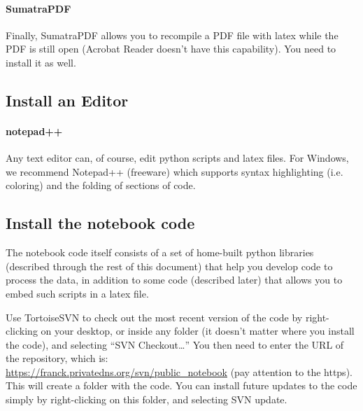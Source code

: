 \paragraph{SumatraPDF}
Finally, SumatraPDF allows you to recompile a PDF
    file with latex while the PDF is still open
    (Acrobat Reader doesn't have this capability).
You need to install it as well.
\subsection{Install an Editor}
\paragraph{notepad++}
Any text editor can, of course, edit
    python scripts and latex files.
For Windows,
    we recommend Notepad++ (freeware)
    which supports syntax highlighting (i.e. coloring)
    and the folding of sections of code.
\subsection{Install the notebook code}
The notebook code itself consists of a set of home-built
    python libraries
    (described through the rest of this document)
    that help you develop code to process the data,
    in addition to some code (described later)
    that allows you to embed such scripts in a latex file.

Use TortoiseSVN to check out the
    most recent version of the code
    by right-clicking on your desktop,
    or inside any folder
    (it doesn't matter where you install the code),
    and selecting ``SVN Checkout\ldots''
You then need to enter the URL of the repository, which is:
    \\ \url{https://franck.privatedns.org/svn/public\_notebook}
    (pay attention to the https).\\ 
This will create a folder with the code.
You can install future updates to the code
    simply by right-clicking on this folder,
    and selecting SVN update.
